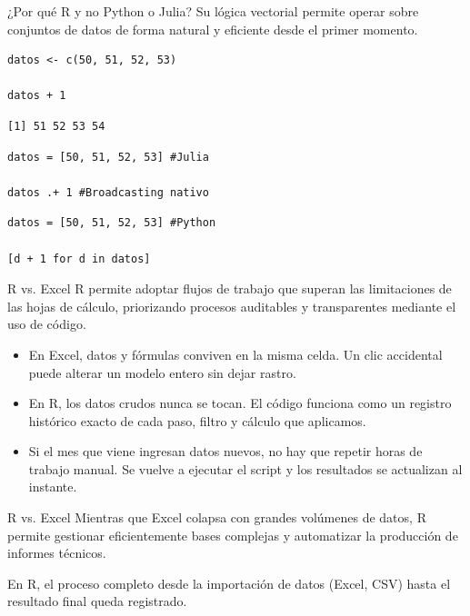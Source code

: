 \documentclass[8pt]{beamer}
\begin{document}
	
	\begin{frame}[fragile]{¿Por qué R y no Python o Julia?}
		Su lógica vectorial permite operar sobre conjuntos de datos de forma natural y eficiente desde el primer momento.
		
\begin{lstlisting}[style=RScript]
datos <- c(50, 51, 52, 53)

datos + 1
\end{lstlisting}
\begin{lstlisting}[style=RConsole]
[1] 51 52 53 54
\end{lstlisting}
\begin{lstlisting}[style=JuliaScript]
datos = [50, 51, 52, 53] #Julia

datos .+ 1 #Broadcasting nativo
\end{lstlisting}
\begin{lstlisting}[style=PythonScript]
datos = [50, 51, 52, 53] #Python

[d + 1 for d in datos]
\end{lstlisting}
	\end{frame}
	
	\begin{frame}{R vs. Excel}
		R permite adoptar flujos de trabajo que superan las limitaciones de las hojas de cálculo, priorizando procesos auditables y transparentes mediante el uso de código.
		
		\begin{itemize}
			\item {} En Excel, datos y fórmulas conviven en la misma celda. Un clic accidental puede alterar un modelo entero sin dejar rastro.
			
			\item {} En R, los datos crudos nunca se tocan. El código funciona como un registro histórico exacto de cada paso, filtro y cálculo que aplicamos.
			
			\item {} Si el mes que viene ingresan datos nuevos, no hay que repetir horas de trabajo manual. Se vuelve a ejecutar el script y los resultados se actualizan al instante.
		\end{itemize}
	\end{frame}
	
	\begin{frame}{R vs. Excel}
		Mientras que Excel colapsa con grandes volúmenes de datos, R permite gestionar eficientemente bases complejas y automatizar la producción de informes técnicos.
		
		En R, el proceso completo desde la importación de datos (Excel, CSV) hasta el resultado final queda registrado.
	\end{frame}
\end{document}
